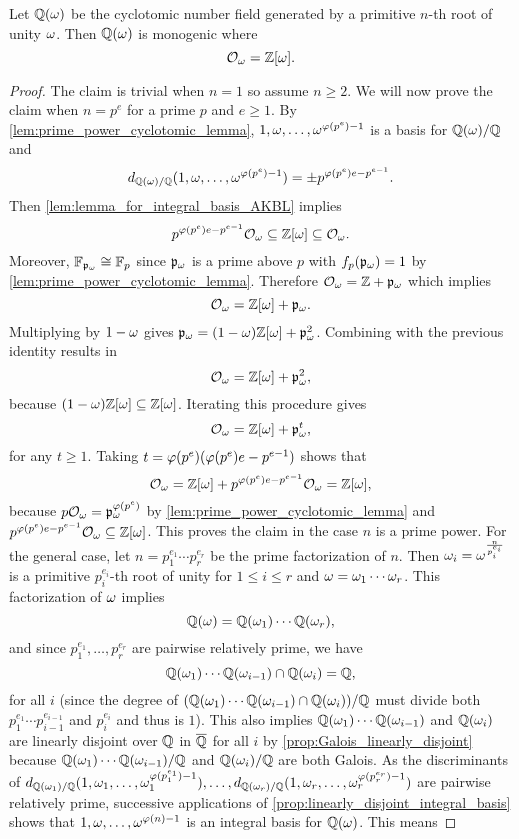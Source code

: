     \begin{proposition}\label{prop:cyclotomic_is_monogenic}
      Let $\mathbb{Q}(\omega)$ be the cyclotomic number field generated by a primitive $n$-th root of unity $\omega$. Then $\mathbb{Q}(\omega)$ is monogenic where
      \[
        \mathcal{O}_{\omega} = \mathbb{Z}[\omega].
      \]
    \end{proposition}
    \begin{proof}
      The claim is trivial when $n = 1$ so assume $n \ge 2$. We will now prove the claim when $n = p^{e}$ for a prime $p$ and $e \ge 1$. By \cref{lem:prime_power_cyclotomic_lemma}, $1,\omega,\ldots,\omega^{\varphi(p^{e})-1}$ is a basis for $\mathbb{Q}(\omega)/\mathbb{Q}$ and
      \[
        d_{\mathbb{Q}(\omega)/\mathbb{Q}}(1,\omega,\ldots,\omega^{\varphi(p^{e})-1}) = \pm p^{\varphi(p^{e})e-p^{e-1}}.
      \]
      Then \cref{lem:lemma_for_integral_basis_AKBL} implies
      \[
        p^{\varphi(p^{e})e-p^{e-1}}\mathcal{O}_{\omega} \subseteq \mathbb{Z}[\omega] \subseteq \mathcal{O}_{\omega}.
      \]
      Moreover, $\mathbb{F}_{\mathfrak{p}_{\omega}} \cong \mathbb{F}_{p}$ since $\mathfrak{p}_{\omega}$ is a prime above $p$ with $f_{p}(\mathfrak{p}_{\omega}) = 1$ by \cref{lem:prime_power_cyclotomic_lemma}. Therefore $\mathcal{O}_{\omega} = \mathbb{Z}+\mathfrak{p}_{\omega}$ which implies
      \[
        \mathcal{O}_{\omega} = \mathbb{Z}[\omega]+\mathfrak{p}_{\omega}.
      \]
      Multiplying by $1-\omega$ gives $\mathfrak{p}_{\omega} = (1-\omega)\mathbb{Z}[\omega]+\mathfrak{p}_{\omega}^{2}$. Combining with the previous identity results in
      \[
        \mathcal{O}_{\omega} = \mathbb{Z}[\omega]+\mathfrak{p}_{\omega}^{2},
      \]
      because $(1-\omega)\mathbb{Z}[\omega] \subseteq \mathbb{Z}[\omega]$. Iterating this procedure gives
      \[
        \mathcal{O}_{\omega} = \mathbb{Z}[\omega]+\mathfrak{p}_{\omega}^{t},
      \]
      for any $t \ge 1$. Taking $t = \varphi(p^{e})(\varphi(p^{e})e-p^{e-1})$ shows that
      \[
        \mathcal{O}_{\omega} = \mathbb{Z}[\omega]+p^{\varphi(p^{e})e-p^{e-1}}\mathcal{O}_{\omega} = \mathbb{Z}[\omega],
      \]
      because $p\mathcal{O}_{\omega} = \mathfrak{p}_{\omega}^{\varphi(p^{e})}$ by \cref{lem:prime_power_cyclotomic_lemma} and $p^{\varphi(p^{e})e-p^{e-1}}\mathcal{O}_{\omega} \subseteq \mathbb{Z}[\omega]$. This proves the claim in the case $n$ is a prime power. For the general case, let $n = p_{1}^{e_{1}} \cdots p_{r}^{e_{r}}$ be the prime factorization of $n$. Then $\omega_{i} = \omega^{\frac{n}{ p_{i}^{e_{i}}}}$ is a primitive $p_{i}^{e_{i}}$-th root of unity for $1 \le i \le r$ and $\omega = \omega_{1} \cdots \omega_{r}$. This factorization of $\omega$ implies
      \[
        \mathbb{Q}(\omega) = \mathbb{Q}(\omega_{1}) \cdots \mathbb{Q}(\omega_{r}),
      \]
      and since $p_{1}^{e_{1}},\ldots,p_{r}^{e_{r}}$ are pairwise relatively prime, we have
      \[
        \mathbb{Q}(\omega_{1}) \cdots \mathbb{Q}(\omega_{i-1}) \cap \mathbb{Q}(\omega_{i}) = \mathbb{Q},
      \]
      for all $i$ (since the degree of $(\mathbb{Q}(\omega_{1}) \cdots \mathbb{Q}(\omega_{i-1}) \cap \mathbb{Q}(\omega_{i}))/\mathbb{Q}$ must divide both $ p_{1}^{e_{1}} \cdots p_{i-1}^{e_{i-1}}$ and $p_{i}^{e_{i}}$ and thus is $1$). This also implies $\mathbb{Q}(\omega_{1}) \cdots \mathbb{Q}(\omega_{i-1})$ and $\mathbb{Q}(\omega_{i})$ are linearly disjoint over $\mathbb{Q}$ in $\overline{\mathbb{Q}}$ for all $i$ by \cref{prop:Galois_linearly_disjoint} because $\mathbb{Q}(\omega_{1}) \cdots \mathbb{Q}(\omega_{i-1})/\mathbb{Q}$ and $\mathbb{Q}(\omega_{i})/\mathbb{Q}$ are both Galois. As the discriminants of $d_{\mathbb{Q}(\omega_{1})/\mathbb{Q}}(1,\omega_{1},\ldots,\omega_{1}^{\varphi(p_{1}^{e_{1}})-1}),\ldots,d_{\mathbb{Q}(\omega_{r})/\mathbb{Q}}(1,\omega_{r},\ldots,\omega_{r}^{\varphi(p_{r}^{e_{r}})-1})$ are pairwise relatively prime, successive applications of \cref{prop:linearly_disjoint_integral_basis} shows that $1,\omega,\ldots,\omega^{\varphi(n)-1}$ is an integral basis for $\mathbb{Q}(\omega)$. This means

\end{proof}
